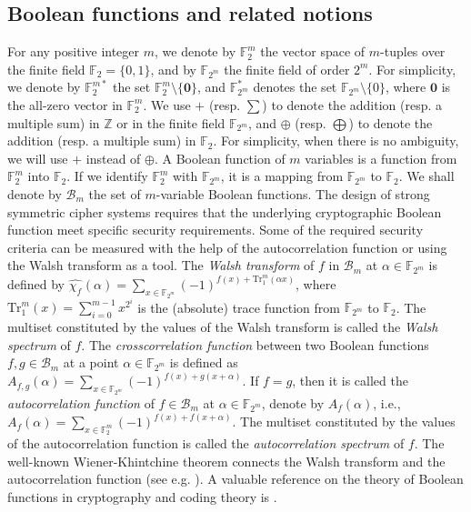 \documentclass[10pt]{article}
\newcommand{\F}{\mathbb{F}}
\newcommand{\0}{\textbf{0}}
\newcommand{\1}{\textbf{1}}
\newcommand{\W}[2][]{\widehat{\chi_{#2}}^{#1}}
\begin{document}
\subsection{Boolean functions and related notions}\label{sec:Pre1}
For any positive integer $m$, we denote by $\F_2^m$ the vector space of $m$-tuples over the
finite field $\F_2=\{0,1\}$, and by $\F_{2^m}$ the finite field of order $2^m$.
For simplicity, we denote by $\F_2^{m*}$ the set $\F_2^{m}\setminus\{\0\}$, and
 $\F_{2^m}^*$ denotes the set $\F_{2^m}\setminus\{0\}$, where $\0$ is the all-zero vector in $\F_2^m$.
We use $+$ (resp. $\sum$) to denote the addition (resp. a multiple sum) in $\mathbb{Z}$ or in the finite field $\F_{2^m}$, and
$\oplus$ (resp. $\bigoplus$) to denote the addition (resp. a multiple sum) in $\F_2$.
For simplicity, when there is no ambiguity, we will use $+$ instead of $\oplus$.
A Boolean function of $m$ variables is a function from $\F_2^m$ into $\F_2$. If we identify $\F_2^m$ with $\F_{2^m}$, it is a mapping from
$\F_{2^m}$ to $\F_{2}$. We shall denote by $\mathcal{B}_m$ the set of $m$-variable Boolean functions.
The design of strong symmetric cipher systems requires that the underlying cryptographic Boolean function meet specific security requirements.
Some of the required security criteria can be measured with the help of the autocorrelation function or using the Walsh transform as a tool.
The \emph{Walsh transform} of $f$ in $\mathcal{B}_m$ at  $\alpha\in \F_{2^m}$ is defined by $\W f(\alpha)=\sum_{x\in\F_{2^m}}(-1)^{f(x)+\mathrm{Tr}_1^m(\alpha x)}$,
where $\mathrm{Tr}_1^m(x)=\sum\limits_{i=0}^{m-1}x^{2^i}$ is the (absolute)  trace function from $\F_{2^m}$ to $\F_2$.
The multiset constituted by the values of the Walsh transform is called the  \emph{Walsh spectrum} of $f$.
{\color{blue}
The \emph{crosscorrelation function} between two Boolean functions $f,g\in\mathcal B_m$ at a point $\alpha\in\F_{2^m}$  is defined as
$A_{f,g}(\alpha)=\sum_{x\in\F_{2^m}} (-1)^{f(x)+g(x+\alpha)}$.
If $f=g$, then it is called the \emph{autocorrelation function} of $f\in\mathcal B_m$ at $\alpha\in\F_{2^m}$, denote by $A_f(\alpha)$, i.e.,
$A_f(\alpha)=\sum_{x\in\F_2^m} (-1)^{f(x)+f(x+\alpha)}$.}
The multiset constituted by the values of the autocorrelation function is called the \emph{autocorrelation spectrum} of $f$.
The well-known Wiener-Khintchine theorem connects the Walsh transform and the autocorrelation function (see e.g.  \cite{Carl93}). A valuable reference on the theory of Boolean functions in cryptography and coding theory is \cite{Book-Carlet}.
\end{document}
